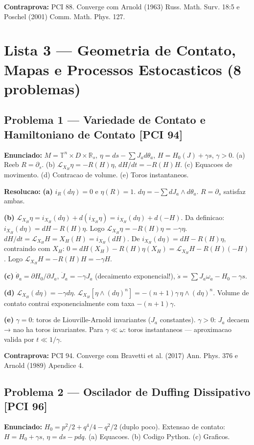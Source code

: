 \documentclass[12pt,a4paper,oneside]{article}
\begin{document}
\textbf{Contraprova:} PCI 88. Converge com Arnold (1963) Russ. Math. Surv. 18:5 e Poschel (2001) Comm. Math. Phys. 127.

\section{Lista 3 — Geometria de Contato, Mapas e Processos Estocasticos (8 problemas)}

\subsection{Problema 1 — Variedade de Contato e Hamiltoniano de Contato [PCI 94]}
\textbf{Enunciado:} $M=\mathbb{T}^n\times D\times\mathbb{R}_s$, $\eta=ds-\sum J_ad\theta_a$, $H=H_0(J)+\gamma s$, $\gamma>0$.
(a) Reeb $R=\partial_s$. (b) $\mathcal{L}_{X_H}\eta=-R(H)\eta$, $dH/dt=-R(H)H$.
(c) Equacoes de movimento. (d) Contracao de volume. (e) Toros instantaneos.

\textbf{Resolucao:}
\textbf{(a)} $i_R(d\eta)=0$ e $\eta(R)=1$. $d\eta=-\sum dJ_a\wedge d\theta_a$. $R=\partial_s$ satisfaz ambas.

\textbf{(b)} $\mathcal{L}_{X_H}\eta=i_{X_H}(d\eta)+d(i_{X_H}\eta)=i_{X_H}(d\eta)+d(-H)$. Da definicao: $i_{X_H}(d\eta)=dH-R(H)\eta$. Logo $\mathcal{L}_{X_H}\eta=-R(H)\eta=-\gamma\eta$.
$dH/dt=\mathcal{L}_{X_H}H=X_H(H)=i_{X_H}(dH)$. De $i_{X_H}(d\eta)=dH-R(H)\eta$, contraindo com $X_H$: $0=dH(X_H)-R(H)\eta(X_H)=\mathcal{L}_{X_H}H-R(H)(-H)$. Logo $\mathcal{L}_{X_H}H=-R(H)H=-\gamma H$.

\textbf{(c)} $\dot\theta_a=\partial H_0/\partial J_a$, $\dot J_a=-\gamma J_a$ (decaimento exponencial!), $\dot s=\sum J_a\omega_a-H_0-\gamma s$.

\textbf{(d)} $\mathcal{L}_{X_H}(d\eta)=-\gamma d\eta$. $\mathcal{L}_{X_H}[\eta\wedge(d\eta)^n]=-(n+1)\gamma\,\eta\wedge(d\eta)^n$. Volume de contato contrai exponencialmente com taxa $-(n+1)\gamma$.

\textbf{(e)} $\gamma=0$: toros de Liouville-Arnold invariantes ($J_a$ constantes). $\gamma>0$: $J_a$ decaem → nao ha toros invariantes. Para $\gamma\ll\omega$: toros instantaneos — aproximacao valida por $t\ll1/\gamma$.

\textbf{Contraprova:} PCI 94. Converge com Bravetti et al. (2017) Ann. Phys. 376 e Arnold (1989) Apendice 4.

\subsection{Problema 2 — Oscilador de Duffing Dissipativo [PCI 96]}
\textbf{Enunciado:} $H_0=p^2/2+q^4/4-q^2/2$ (duplo poco). Extensao de contato: $H=H_0+\gamma s$, $\eta=ds-pdq$.
(a) Equacoes. (b) Codigo Python. (c) Graficos.
\end{document}
